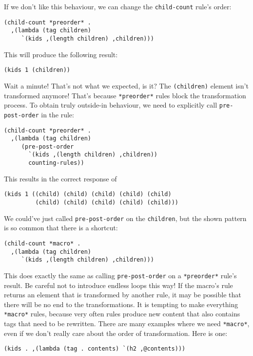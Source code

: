 \documentclass{article}
\begin{document}
If we don't like this behaviour, we can change the \verb|child-count|
rule's order:
\begin{verbatim}
(child-count *preorder* .
  ,(lambda (tag children)
     `(kids ,(length children) ,children)))
\end{verbatim}

This will produce the following result:

\begin{verbatim}
(kids 1 (children))
\end{verbatim}

Wait a minute!  That's not what we expected, is it?  The
\verb|(children)| element isn't transformed anymore!  That's because
\verb|*preorder*| rules block the transformation process.  To obtain
truly outside-in behaviour, we need to explicitly call
\verb|pre-post-order| in the rule:

\begin{verbatim}
(child-count *preorder* .
  ,(lambda (tag children)
     (pre-post-order
       `(kids ,(length children) ,children))
       counting-rules))
\end{verbatim}

This results in the correct response of
\begin{verbatim}
(kids 1 ((child) (child) (child) (child) (child)
         (child) (child) (child) (child) (child)))
\end{verbatim}
We could've just called \verb|pre-post-order| on the \verb|children|,
but the shown pattern is so common that there is a shortcut:

\begin{verbatim}
(child-count *macro* .
  ,(lambda (tag children)
     `(kids ,(length children) ,children)))
\end{verbatim}

This does exactly the same as calling \verb|pre-post-order| on a
\verb|*preorder*| rule's result.  Be careful not to introduce endless
loops this way!  If the macro's rule returns an element that is
transformed by another rule, it may be possible that there will be no
end to the transformations.  It is tempting to make everything
\verb|*macro*| rules, because very often rules produce new content
that also contains tags that need to be rewritten.  There are many
examples where we need \verb|*macro*|, even if we don't really care
about the order of transformation.  Here is one:

\begin{verbatim}
(kids . ,(lambda (tag . contents) `(h2 ,@contents)))
\end{verbatim}
\end{document}
